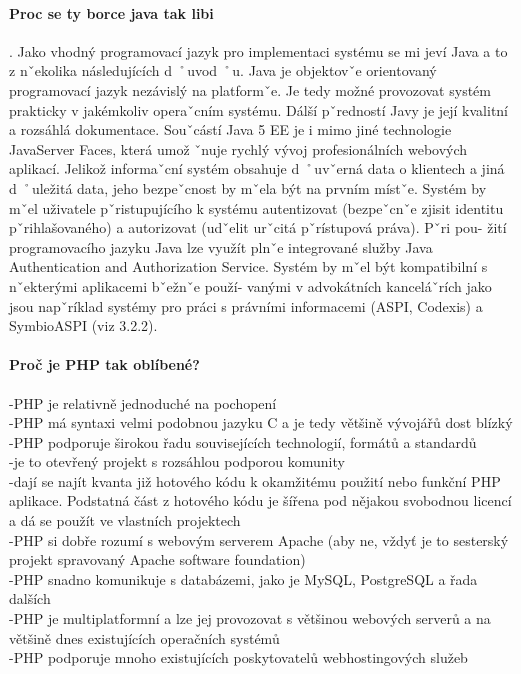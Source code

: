 \documentclass[11pt,oneside]{fithesis}
\begin{document}


\paragraph*{Proc se ty borce java tak libi}

.
Jako vhodný programovací jazyk pro implementaci systému se mi jeví
Java a to z nˇekolika následujících d ˚uvod ˚u. Java je objektovˇe orientovaný
programovací jazyk nezávislý na platformˇe. Je tedy možné provozovat
systém prakticky v jakémkoliv operaˇcním systému. Dálší pˇredností Javy
je její kvalitní a rozsáhlá dokumentace. Souˇcástí Java 5 EE je i mimo jiné
technologie JavaServer Faces, která umož ˇnuje rychlý vývoj profesionálních
webových aplikací.
Jelikož informaˇcní systém obsahuje d ˚uvˇerná data o klientech a jiná d ˚uležitá
data, jeho bezpeˇcnost by mˇela být na prvním místˇe. Systém by mˇel
uživatele pˇristupujícího k systému autentizovat (bezpeˇcnˇe zjisit identitu
pˇrihlašovaného) a autorizovat (udˇelit urˇcitá pˇrístupová práva). Pˇri pou-
žití programovacího jazyku Java lze využít plnˇe integrované služby Java
Authentication and Authorization Service.
Systém by mˇel být kompatibilní s nˇekterými aplikacemi bˇežnˇe použí-
vanými v advokátních kanceláˇrích jako jsou napˇríklad systémy pro práci
s právními informacemi (ASPI, Codexis) a SymbioASPI (viz 3.2.2).


       \paragraph*{Proč je PHP tak oblíbené?}
-PHP je relativně jednoduché na pochopení\\
-PHP má syntaxi velmi podobnou jazyku C a je tedy většině vývojářů dost blízký\\
-PHP podporuje širokou řadu souvisejících technologií, formátů a standardů\\
-je to otevřený projekt s rozsáhlou podporou komunity\\
-dají se najít kvanta již hotového kódu k okamžitému použití nebo funkční PHP aplikace. Podstatná část z hotového kódu je šířena pod nějakou svobodnou licencí a dá se použít ve vlastních projektech\\
-PHP si dobře rozumí s webovým serverem Apache (aby ne, vždyť je to sesterský projekt spravovaný Apache software foundation)\\
-PHP snadno komunikuje s databázemi, jako je MySQL, PostgreSQL a řada dalších\\
-PHP je multiplatformní a lze jej provozovat s většinou webových serverů a na většině dnes existujících operačních systémů\\
-PHP podporuje mnoho existujících poskytovatelů webhostingových služeb\\
\end{document}

